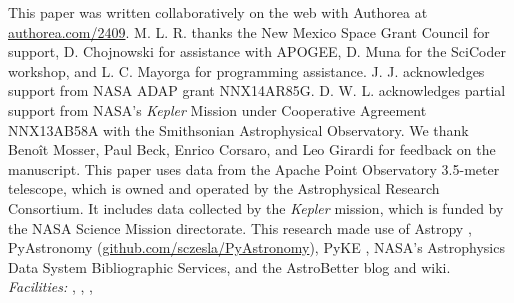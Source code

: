 \acknowledgments
This paper was written collaboratively on the web with Authorea at \url{authorea.com/2409}. M. L. R. thanks the New Mexico Space Grant Council for support, D. Chojnowski for assistance with APOGEE, D. Muna for the SciCoder workshop, and L. C. Mayorga for programming assistance. J. J. acknowledges support from NASA ADAP grant NNX14AR85G. D. W. L. acknowledges partial support from NASA's \emph{Kepler} Mission under Cooperative Agreement NNX13AB58A with the Smithsonian Astrophysical Observatory. We thank Beno{\^i}t Mosser, Paul Beck, Enrico Corsaro, and Leo Girardi for feedback on the manuscript. This paper uses data from the Apache Point Observatory 3.5-meter telescope, which is owned and operated by the Astrophysical Research Consortium. It includes data collected by the \emph{Kepler} mission, which is funded by the NASA Science Mission directorate. This research made use of Astropy \citep{astropy}, PyAstronomy (\url{github.com/sczesla/PyAstronomy}), PyKE \citep{pyke}, NASA's Astrophysics Data System Bibliographic Services, and the AstroBetter blog and wiki.
\\

{\it Facilities:} , , , 

  